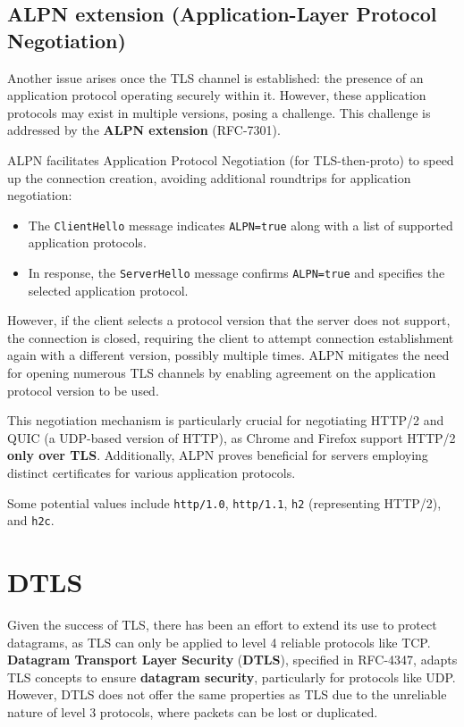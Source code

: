 \subsection{ALPN extension (Application-Layer Protocol Negotiation)}
Another issue arises once the TLS channel is established: the presence of an application protocol operating securely within it. However, these application protocols may exist in multiple versions, posing a challenge. This challenge is addressed by the \textbf{ALPN extension} (RFC-7301).

ALPN facilitates Application Protocol Negotiation (for TLS-then-proto) to speed up the connection creation, avoiding additional roundtrips for application negotiation:
\begin{itemize}
	\item The \texttt{ClientHello} message indicates \texttt{ALPN=true} along with a list of supported application protocols.
	\item In response, the \texttt{ServerHello} message confirms \texttt{ALPN=true} and specifies the selected application protocol.
\end{itemize}

However, if the client selects a protocol version that the server does not support, the connection is closed, requiring the client to attempt connection establishment again with a different version, possibly multiple times. ALPN mitigates the need for opening numerous TLS channels by enabling agreement on the application protocol version to be used.

This negotiation mechanism is particularly crucial for negotiating HTTP/2 and QUIC (a UDP-based version of HTTP), as Chrome and Firefox support HTTP/2 \textbf{only over TLS}. Additionally, ALPN proves beneficial for servers employing distinct certificates for various application protocols.

Some potential values include \texttt{http/1.0}, \texttt{http/1.1}, \texttt{h2} (representing HTTP/2), and \texttt{h2c}.


\section{DTLS}

Given the success of TLS, there has been an effort to extend its use to protect datagrams, as TLS can only be applied to level 4 reliable protocols like TCP. \textbf{Datagram Transport Layer Security} (\textbf{DTLS}), specified in RFC-4347, adapts TLS concepts to ensure \textbf{datagram security}, particularly for protocols like UDP. However, DTLS does not offer the same properties as TLS due to the unreliable nature of level 3 protocols, where packets can be lost or duplicated.

